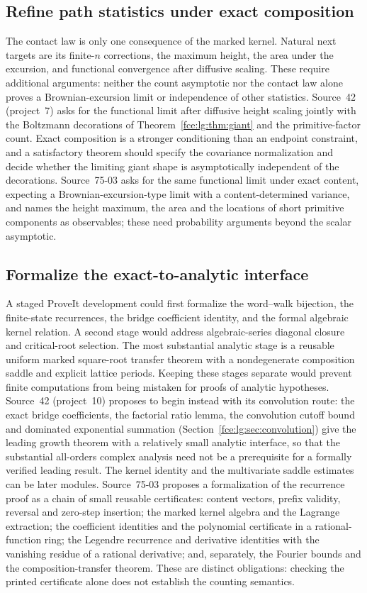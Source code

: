 \documentclass[11pt,a4paper]{article}
\numberwithin{equation}{section}
\theoremstyle{definition}\newtheorem{definition}[theorem]{Definition}
\theoremstyle{remark}\newtheorem{remark}[theorem]{Remark}
\begin{document}
\subsection{Refine path statistics under exact composition}
The contact law is only one consequence of the marked kernel. Natural
next targets are its finite-$n$ corrections, the maximum height, the area
under the excursion, and functional convergence after diffusive scaling.
These require additional arguments: neither the count asymptotic nor the
contact law alone proves a Brownian-excursion limit or independence of
other statistics. Source~42 (project~7) asks for the functional limit
after diffusive height scaling jointly with the Boltzmann decorations of
Theorem~\ref{fce:lg:thm:giant} and the primitive-factor count. Exact
composition is a stronger conditioning than an endpoint constraint, and a
satisfactory theorem should specify the covariance normalization and
decide whether the limiting giant shape is asymptotically independent of
the decorations. Source~75-03 asks for the same functional limit under
exact content, expecting a Brownian-excursion-type limit with a
content-determined variance, and names the height maximum, the area and
the locations of short primitive components as observables; these need
probability arguments beyond the scalar asymptotic.

\subsection{Formalize the exact-to-analytic interface}
A staged ProveIt development could first formalize the word--walk
bijection, the finite-state recurrences, the bridge coefficient identity,
and the formal algebraic kernel relation. A second stage would address
algebraic-series diagonal closure and critical-root selection. The most
substantial analytic stage is a reusable uniform marked square-root
transfer theorem with a nondegenerate composition saddle and explicit
lattice periods. Keeping these stages separate would prevent finite
computations from being mistaken for proofs of analytic hypotheses.
Source~42 (project~10) proposes to begin instead with its convolution
route: the exact bridge coefficients, the factorial ratio lemma, the
convolution cutoff bound and dominated exponential summation
(Section~\ref{fce:lg:sec:convolution}) give the leading growth theorem with
a relatively small analytic interface, so that the substantial all-orders
complex analysis need not be a prerequisite for a formally verified
leading result. The kernel identity and the multivariate saddle estimates
can be later modules. Source~75-03 proposes a formalization of the
recurrence proof as a chain of small reusable certificates: content
vectors, prefix validity, reversal and zero-step insertion; the marked
kernel algebra and the Lagrange extraction; the coefficient identities
and the polynomial certificate in a rational-function ring; the Legendre
recurrence and derivative identities with the vanishing residue of a
rational derivative; and, separately, the Fourier bounds and the
composition-transfer theorem. These are distinct obligations: checking the
printed certificate alone does not establish the counting semantics.
\end{document}
